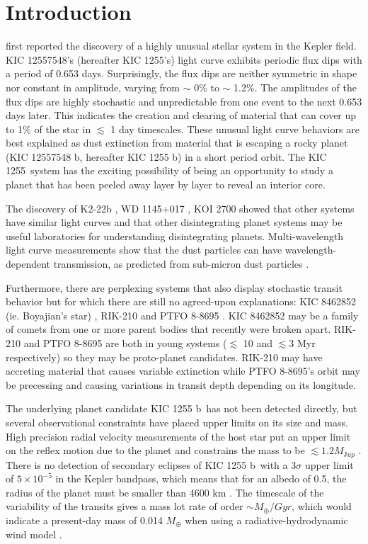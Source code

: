 \documentclass[preprint]{aastex61}
\newcommand{\sha}{KIC 1255 b}
\newcommand{\shStar}{KIC 1255}
\begin{document}
\section{Introduction}
\citet{rappaport} first reported the discovery of a highly unusual stellar system in the Kepler field.
KIC 12557548's (hereafter \shStar's) light curve exhibits periodic flux dips with a period of 0.653 days.
Surprisingly, the flux dips are neither symmetric in shape nor constant in amplitude, varying from $\sim$ 0\% to $\sim$ 1.2\%.
The amplitudes of the flux dips are highly stochastic and unpredictable from one event to the next 0.653 days later.
This indicates the creation and clearing of material that can cover up to 1\% of the star in $\lesssim$ 1 day timescales.
These unusual light curve behaviors are best explained as dust extinction from material that is escaping a rocky planet (KIC 12557548 b, hereafter \sha) in a short period orbit.
The \shStar\ system has the exciting possibility of being an opportunity to study a planet that has been peeled away layer by layer to reveal an interior core.

The discovery of K2-22b \citep{sanchis-ojedak2-22}, WD 1145+017 \citep{vanderburg2015wdDisintegrating}, KOI 2700 \citep{rappaport2014KOI2700} showed that other systems have similar light curves and that other disintegrating planet systems may be useful laboratories for understanding disintegrating planets.
Multi-wavelength light curve measurements show that the dust particles can have wavelength-dependent transmission, as predicted from sub-micron dust particles \citep{bochinski2015evolving,sanchis-ojedak2-22}.

Furthermore, there are perplexing systems that also display stochastic transit behavior but for which there are still no agreed-upon explanations: KIC 8462852 (ie. Boyajian's star) \citep{boyajian846}, RIK-210 \citep{david2017rik210} and PTFO 8-8695 \citep{vanEyken2012ptfTTauri}.
KIC 8462852 may be a family of comets from one or more parent bodies that recently were broken apart.
RIK-210 and PTFO 8-8695 are both in young systems ($\lesssim$ 10 and $\lesssim$3 Myr respectively) so they may be proto-planet candidates.
RIK-210 may have accreting material that causes variable extinction while PTFO 8-8695's orbit may be precessing and causing variations in transit depth depending on its longitude.

The underlying planet candidate \sha\ has not been detected directly, but several observational constraints have placed upper limits on its size and mass.
High precision radial velocity measurements of the host star put an upper limit on the reflex motion due to the planet and constrains the mass to be $\lesssim 1.2 M_{\mathrm Jup}$ \citep{croll2014}.
There is no detection of secondary eclipses of \sha\ with a 3$\sigma$ upper limit of $5 \times 10^{-5}$ in the Kepler bandpass, which means that for an albedo of 0.5, the radius of the planet must be smaller than 4600 km \citep{vanWerkhoven2014}.
The timescale of the variability of the transits gives a mass lot rate of order $\sim M_\oplus/Gyr$, which would indicate a present-day mass of 0.014 $M_\oplus$ when using a radiative-hydrodynamic wind model \citep{perez-becker}.
\end{document}
